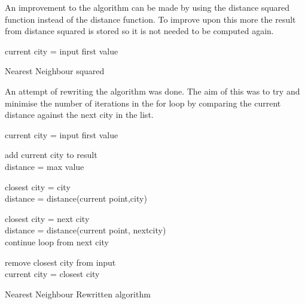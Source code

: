 \documentclass[conference,backref=page]{acmsiggraph}
\begin{document}
An improvement to the algorithm can be made by using the distance squared function instead of the distance function. To improve upon this more the result from distance squared is stored so it is not needed to be computed again.\hfill

\begin{algorithm}[h]	
	current city = input first value\\
\caption{Nearest Neighbour squared}
\end{algorithm}\hfill

An attempt of rewriting the algorithm was done. The aim of this was to try and minimise the number of iterations in the for loop by comparing the current distance against the next city in the list.
\begin{algorithm}[h]
	current city = input first value\\
	{
		add current city to result\\
		distance = max value\\
		{
			{
				closest city = city\\
				distance = distance(current point,city)\\
			}
			{
				{
					
					closest city = next city \\
					distance = distance(current point, nextcity)\\
					continue loop from next city\\
				}
			}
		}
		remove closest city from input\\
		current city = closest city\\
	}
	\caption{Nearest Neighbour Rewritten algorithm}
\end{algorithm}
\end{document}
